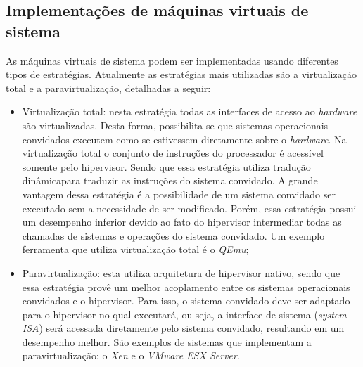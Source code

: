 
\subsection{Implementações de máquinas virtuais de sistema}
\label{section:virtestrat}

As máquinas virtuais de sistema podem ser implementadas usando diferentes tipos de estratégias. Atualmente as estratégias mais utilizadas
são a virtualização total e a paravirtualização, detalhadas a seguir:

\begin{itemize}
 \item Virtualização total: nesta estratégia todas as interfaces de acesso ao \textit{hardware} são virtualizadas. Desta forma, possibilita-se 
 que sistemas operacionais convidados executem como se estivessem diretamente sobre o \textit{hardware}. Na virtualização total o conjunto de 
 instruções do processador é acessível somente pelo hipervisor. Sendo que essa estratégia utiliza tradução dinâmica\footnotemark[1]
 para traduzir as instruções do sistema convidado. A grande vantagem dessa estratégia é a possibilidade de um sistema convidado ser executado 
 sem a necessidade de ser modificado. Porém, essa estratégia possui um desempenho inferior devido ao fato do hipervisor intermediar todas as 
 chamadas de sistemas e operações do sistema convidado. Um exemplo ferramenta que utiliza virtualização total é o \textit{QEmu};
 \item Paravirtualização: esta utiliza arquitetura de hipervisor nativo, sendo que essa estratégia provê um melhor acoplamento entre os 
 sistemas operacionais convidados e o hipervisor. Para isso, o sistema convidado deve ser adaptado para o hipervisor no qual executará, 
 ou seja, a interface de sistema (\textit{system ISA}) será acessada diretamente pelo sistema convidado, resultando em um desempenho melhor. 
 São exemplos de sistemas que implementam a paravirtualização: o \textit{Xen} e o \textit{VMware ESX Server}.
\end{itemize}

